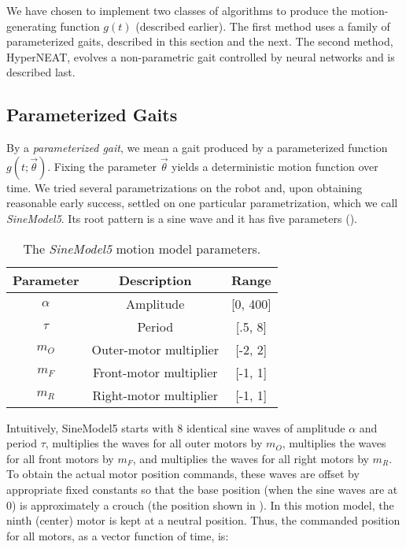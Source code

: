 We have chosen to implement two classes of algorithms to produce
the motion-generating function $g(t)$ (described earlier).  The
first method uses a family of parameterized gaits, described in this
section and the next. The second method, HyperNEAT, evolves a non-parametric gait
controlled by neural networks and is described last.

\subsection{Parameterized Gaits}

By a \emph{parameterized gait}, we mean a gait produced by a
parameterized function $g(t; \vec{\theta})$. Fixing the parameter
$\vec{\theta}$ yields a deterministic motion function over time.  We
tried several parametrizations on the robot and, upon obtaining
reasonable early success, settled on one particular parametrization, which we call  \emph{SineModel5}. Its root pattern is a sine wave and it has five parameters ().

\newcommand{\amp}{\ensuremath{\alpha}}

\begin{table}[h!]
\begin{center}
\begin{tabular}{|c|c|c|}
\hline
Parameter    & Description               & Range \\
\hline
\hline
\amp         & Amplitude                 & [0, 400] \\
\hline
$\tau$       & Period                    & [.5, 8] \\
\hline
$m_O$        & Outer-motor multiplier    & [-2, 2] \\
\hline
$m_F$        & Front-motor multiplier    & [-1, 1] \\
\hline
$m_R$        & Right-motor multiplier    & [-1, 1] \\
\hline
\end{tabular}
\caption{The \emph{SineModel5} motion model parameters.}
\label{tab:params}
\end{center}
\end{table}

Intuitively, SineModel5 starts with 8 identical sine waves of
amplitude $\amp$ and period $\tau$, multiplies the waves for all outer
motors by $m_O$, multiplies the waves for all front motors by $m_F$,
and multiplies the waves for all right motors by $m_R$.  To obtain the
actual motor position commands, these waves are offset by
appropriate fixed constants so that the base position (when the sine
waves are at 0) is approximately a crouch (the position shown in
).  In this motion model, the ninth
(center) motor is kept at a neutral position.  Thus, the commanded
position for all motors, as a vector function of time, is:

